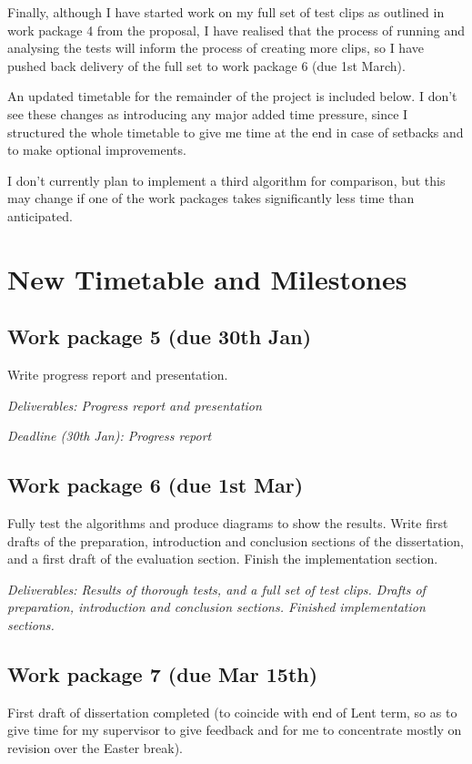 \documentclass[12pt]{article}
\begin{document}
Finally, although I have started work on my full set of test clips as outlined in work package 4 from the proposal, I have realised that the process of running and analysing the tests will inform the process of creating more clips, so I have pushed back delivery of the full set to work package 6 (due 1st March).

An updated timetable for the remainder of the project is included below. I don't see these changes as introducing any major added time pressure, since I structured the whole timetable to give me time at the end in case of setbacks and to make optional improvements.

I don't currently plan to implement a third algorithm for comparison, but this may change if one of the work packages takes significantly less time than anticipated.


\section*{New Timetable and Milestones}

\subsection*{Work package 5 (due 30th Jan)}
Write progress report and presentation.

\emph{Deliverables: Progress report and presentation}

\emph{Deadline (30th Jan): Progress report}

\subsection*{Work package 6 (due 1st Mar)}
Fully test the algorithms and produce diagrams to show the results. Write first drafts of the preparation, introduction and conclusion sections of the dissertation, and a first draft of the evaluation section. Finish the implementation section.

\emph{Deliverables: Results of thorough tests, and a full set of test clips. Drafts of preparation, introduction and conclusion sections. Finished implementation sections.}

\subsection*{Work package 7 (due Mar 15th)}
First draft of dissertation completed (to coincide with end of Lent term, so as to give time for my supervisor to give feedback and for me to concentrate mostly on revision over the Easter break).
\end{document}
